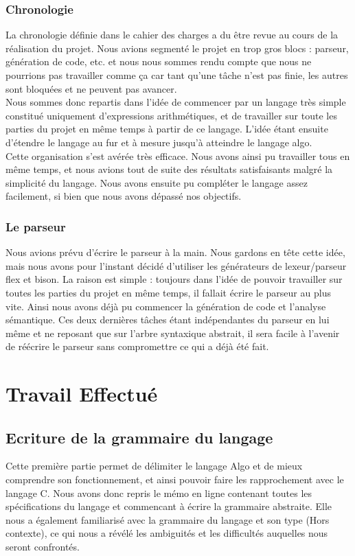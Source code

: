 \documentclass[12pt,a4paper]{report}
\newcommand{\mychapter}[2]{
    \setcounter{chapter}{#1}
    \setcounter{section}{0}
    \chapter*{#2}
    \addcontentsline{toc}{chapter}{#2}
}
\begin{document}
\subsection{Chronologie}
La chronologie définie dans le cahier des charges a du être revue au cours de la réalisation du projet. Nous avions segmenté le projet en trop gros blocs : parseur, génération de code, etc. et nous nous sommes rendu compte que nous ne pourrions pas travailler comme ça car tant qu'une tâche n'est pas finie, les autres sont bloquées et ne peuvent pas avancer. \\

Nous sommes donc repartis dans l'idée de commencer par un langage très simple constitué uniquement d'expressions arithmétiques, et de travailler sur toute les parties du projet en même temps à partir de ce langage. L'idée étant ensuite d'étendre le langage au fur et à mesure jusqu'à atteindre le langage algo. \\

Cette organisation s'est avérée très efficace. Nous avons ainsi pu travailler tous en même temps, et nous avions tout de suite des résultats satisfaisants malgré la simplicité du langage. Nous avons ensuite pu compléter le langage assez facilement, si bien que nous avons dépassé nos objectifs. \\

\subsection{Le parseur}
Nous avions prévu d'écrire le parseur à la main. Nous gardons en tête cette idée, mais nous avons pour l'instant décidé d'utiliser les générateurs de lexeur/parseur flex et bison. La raison est simple : toujours dans l'idée de pouvoir travailler sur toutes les parties du projet en même temps, il fallait écrire le parseur au plus vite. Ainsi nous avons déjà pu commencer la génération de code et l'analyse sémantique. Ces deux dernières tâches étant indépendantes
du parseur en lui même et ne reposant que sur l'arbre syntaxique abstrait, il sera facile à l'avenir de réécrire le parseur sans compromettre ce qui a déjà été fait.

\mychapter{2}{Travail Effectué}
\section{Ecriture de la grammaire du langage}
Cette première partie permet de délimiter le langage Algo et de mieux comprendre son fonctionnement, et ainsi pouvoir faire les rapprochement avec le langage C. Nous avons donc repris le mémo en ligne contenant toutes les spécifications du langage et commencant à écrire la grammaire abstraite. Elle nous a également familiarisé avec la grammaire du langage et son type (Hors contexte), ce qui nous a révélé les ambiguités et les difficultés auquelles nous seront confrontés. \\
\end{document}
